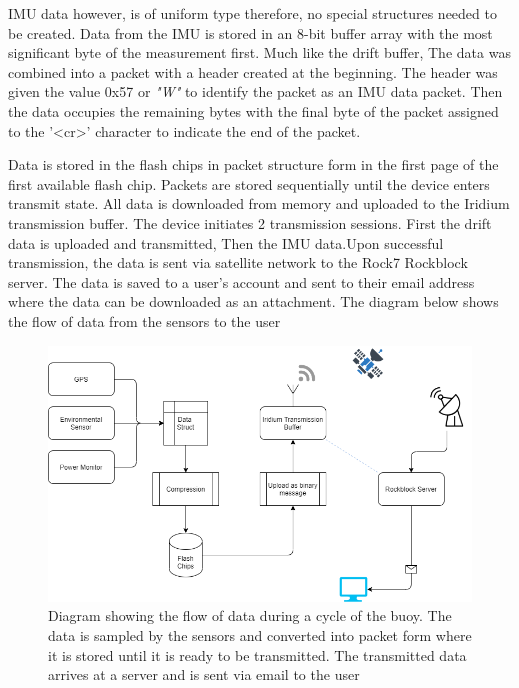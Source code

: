 IMU data however, is of uniform type therefore, no special structures needed to be created. Data from the IMU is stored in an 8-bit buffer array with the most significant byte of the measurement first. Much like the drift buffer, The data was combined into a packet with a header created at the beginning. The header was given the value 0x57 or \textit{"W"} to identify the packet as an IMU data packet. Then the data occupies the remaining bytes with the final byte of the packet assigned to the '<cr>' character to indicate the end of the packet. \par 

Data is stored in the flash chips in packet structure form in the first page of the first available flash chip. Packets are stored sequentially until the device enters transmit state. All data is downloaded from memory and uploaded to the Iridium transmission buffer. The device initiates 2 transmission sessions. First the drift data is uploaded and transmitted, Then the IMU data.Upon successful transmission, the data is sent via satellite network to the Rock7 Rockblock server. The data is saved to a user's account and sent to their email address where the data can be downloaded as an attachment. The diagram below shows the flow of data from the sensors to the user 

\begin{figure}[H]
	\centering
	\includegraphics[scale = 0.5]{Data Flow Diagram.png}
	\caption{Diagram showing the flow of data during a cycle of the buoy. The data is sampled by the sensors and converted into packet form where it is stored until it is ready to be transmitted. The transmitted data arrives at a server and is sent via email to the user}
	\label{fig:data_flow}
\end{figure}